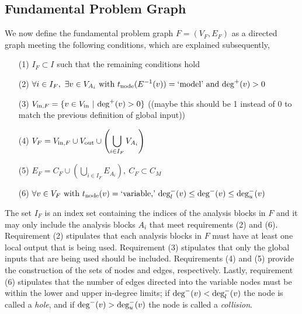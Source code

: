 \subsection{Fundamental Problem Graph}
	\label{ss:FPG}
	We now define the fundamental problem graph $F=(V_F,E_F)$ as a directed graph meeting the following conditions, which are explained subsequently,
	\begin{enumerate}
	\item[(1)] $\displaystyle{I_F \subset I}$ such that the remaining conditions hold
	\item[(2)] $\displaystyle{ \forall i \in I_F, \ \exists v \in V_{A_i} \textrm{ with } t_\textrm{node}(E^{-1}(v))=\textrm{`model'} \textrm{ and } \textrm{deg}^+(v)>0 }$
	\item[(3)] $\displaystyle{V_{\textrm{in},F} = \{v \in V_\textrm{in}  \ | \ \textrm{deg}^+(v) > 0\} }$ ((maybe this should be 1 instead of 0 to match the previous definition of global input))
	\item[(4)] $\displaystyle{V_F = V_{\textrm{in},F} \cup V_\textrm{out} \cup \left( \bigcup_{i \in I_F} V_{A_i} \right)}$
	\item[(5)] $\displaystyle{E_F = C_F \cup \left( \bigcup_{i \in I_F} E_{A_i} \right), \ C_F \subset C_M}$
	\item[(6)] $\displaystyle{\forall v \in V_F \textrm{ with } t_\textrm{node}(v) = \textrm{`variable,'} \  \textrm{deg}_l^-(v) \leq \textrm{deg}^-(v) \leq \textrm{deg}_u^-(v)}$
	\end{enumerate}
	The set $I_F$ is an index set containing the indices of the analysis blocks in $F$ and it may only include the analysis blocks $A_i$ that meet requirements (2) and (6). 
	Requirement (2) stipulates that each analysis blocks in $F$ must have at least one local output that is being used. 
	Requirement (3) stipulates that only the global inputs that are being used should be included. 
	Requirements (4) and (5) provide the construction of the sets of nodes and edges, respectively. 
	Lastly, requirement (6) stipulates that the number of edges directed into the variable nodes must be within the lower and upper in-degree limits; if $\textrm{deg}^-(v) < \textrm{deg}_l^-(v)$ the node is called a \emph{hole}, and if $\textrm{deg}^-(v) > \textrm{deg}_u^-(v)$ the node is called a \emph{collision}. 

